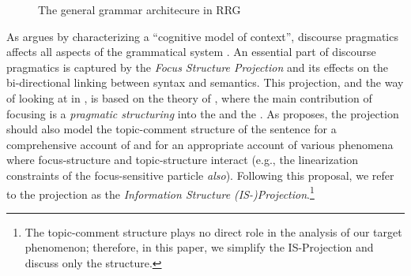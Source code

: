 \documentclass[output=paper,colorlinks,citecolor=brown]{langscibook}
\begin{document}
\begin{figure}[H]
\caption{The general grammar architecure in RRG}
\label{fig:rrg:balogh}
\end{figure}

As \citet[][185]{vanvalin:05} argues by characterizing a ``cognitive model of context'', discourse pragmatics affects all aspects of the grammatical system \citep[for an overview see][]{bentley:23,lvv:23}. An essential part of discourse pragmatics is captured by the \textit{Focus Structure Projection} and its effects on the bi-directional linking between syntax and semantics. This projection, and the way of looking at  in , is based on the theory of \citet{lambrecht:94}, where the main contribution of focusing is a \textit{pragmatic structuring} into the  and the . As \citet{balogh:21} proposes, the projection should also model the topic-comment structure of the sentence for a comprehensive account of  and for an appropriate account of various phenomena where focus-structure and topic-structure interact (e.g., the linearization constraints of the focus-sensitive particle \textit{also}). Following this proposal, we refer to the projection as the \textit{Information Structure (IS-)Projection}.\footnote{The topic-comment structure plays no direct role in the analysis of our target phenomenon; therefore, in this paper, we simplify the IS-Projection and discuss only the  structure.} 
\end{document}
